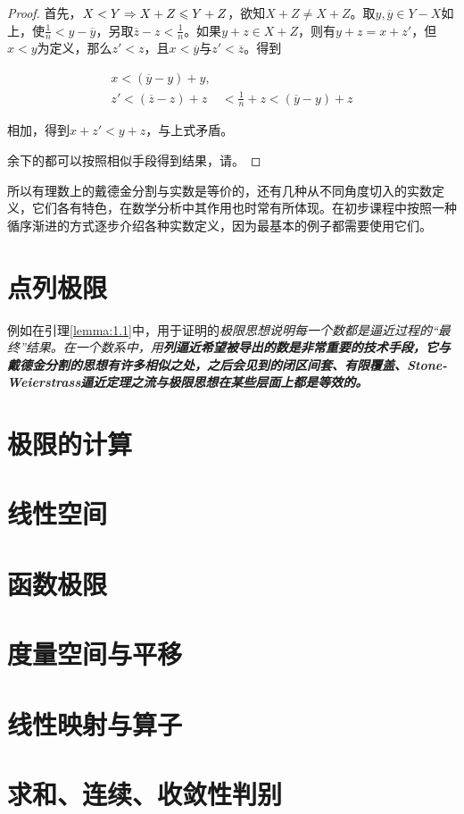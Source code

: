 \begin{proposition}
\begin{proof}
		首先，$X<Y\Rightarrow X+Z\leqslant Y+Z$，欲知$X+Z\neq X+Z$。取$y,\overline{y}\in Y-X$如上，使$\frac{1}{n}<y-\overline{y}$，另取$\overline{z}-z<\frac{1}{n}$。如果$y+z\in X+Z$，则有$y+z=x+z'$，但$x<y$为定义，那么$z'<z$，且$x<\overline{y}$与$z'<\overline{z}$。得到
		
		\begin{align*}
			x<(\overline{y}-y)+y, & \\
			z'<(\overline{z}-z)+z & < \frac{1}{n}+z < (\overline{y}-y)+z
		\end{align*}
		
		相加，得到$x+z'<y+z$，与上式矛盾。
		
		余下的都可以按照相似手段得到结果，请。
		
	\end{proof}
	
\end{proposition}

所以有理数上的戴德金分割与实数是等价的，还有几种从不同角度切入的实数定义，它们各有特色，在数学分析中其作用也时常有所体现。在初步课程中按照一种循序渐进的方式逐步介绍各种实数定义，因为最基本的例子都需要使用它们。


\section{点列极限}

例如在引理\ref{lemma:1.1}中，用于证明的\it{极限思想}说明每一个数都是逼近过程的“最终”结果。在一个数系中，用\bf{列}逼近希望被导出的数是非常重要的技术手段，它与戴德金分割的思想有许多相似之处，之后会见到的闭区间套、有限覆盖、Stone-Weierstrass逼近定理之流与极限思想在某些层面上都是等效的。


\section{极限的计算}




\section{线性空间}




\section{函数极限}




\section{度量空间与平移}




\section{线性映射与算子}




\section{求和、连续、收敛性判别}






